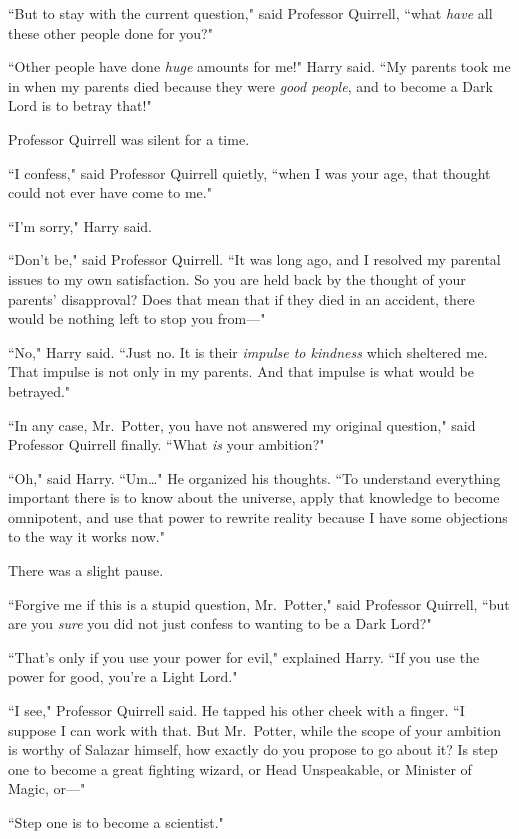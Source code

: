 ``But to stay with the current question," said Professor Quirrell, ``what \emph{have} all these other people done for you?"

``Other people have done \emph{huge} amounts for me!" Harry said. ``My parents took me in when my parents died because they were \emph{good people}, and to become a Dark Lord is to betray that!"

Professor Quirrell was silent for a time.

``I confess," said Professor Quirrell quietly, ``when I was your age, that thought could not ever have come to me."

``I'm sorry," Harry said.

``Don't be," said Professor Quirrell. ``It was long ago, and I resolved my parental issues to my own satisfaction. So you are held back by the thought of your parents' disapproval? Does that mean that if they died in an accident, there would be nothing left to stop you from—"

``No," Harry said. ``Just no. It is their \emph{impulse to kindness} which sheltered me. That impulse is not only in my parents. And that impulse is what would be betrayed."

``In any case, Mr.~Potter, you have not answered my original question," said Professor Quirrell finally. ``What \emph{is} your ambition?"

``Oh," said Harry. ``Um{\ldots}" He organized his thoughts. ``To understand everything important there is to know about the universe, apply that knowledge to become omnipotent, and use that power to rewrite reality because I have some objections to the way it works now."

There was a slight pause.

``Forgive me if this is a stupid question, Mr.~Potter," said Professor Quirrell, ``but are you \emph{sure} you did not just confess to wanting to be a Dark Lord?"

``That's only if you use your power for evil," explained Harry. ``If you use the power for good, you're a Light Lord."

``I see," Professor Quirrell said. He tapped his other cheek with a finger. ``I suppose I can work with that. But Mr.~Potter, while the scope of your ambition is worthy of Salazar himself, how exactly do you propose to go about it? Is step one to become a great fighting wizard, or Head Unspeakable, or Minister of Magic, or—"

``Step one is to become a scientist."

